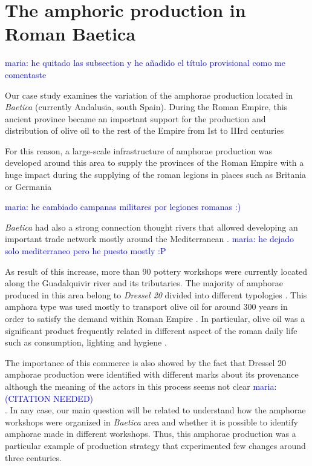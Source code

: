 \documentclass[review]{elsarticle}
\newcommand{\memo}[2]{\textcolor{#1}{#2}}
\newcommand{\maria}[1]{\memo{blue}{maria: #1\\}}
\begin{document}
\section{The amphoric production in Roman Baetica}

\maria{he quitado las subsection y he añadido el t\'itulo provisional como me comentaste}

Our case study examines the variation of the amphorae production located in \emph{Baetica} (currently Andalusia, south Spain). During the Roman Empire, this ancient province became an important support for the production and distribution of olive oil to the rest of the Empire from Ist to IIIrd centuries \cite{chic_comercio_2005,millet_anforas_1998, rodriguez_baetican_1998} 



For this reason, a large-scale infrastructure of amphorae production was developed around this area to supply the provinces of the Roman Empire with a huge impact during the supplying of the roman legions in places such as Britania \citep{funari_economic_2005, monfort_britannia_1998} or Germania \citep{remesal_annona_1986} 

\maria{he cambiado campanas militares por legiones romanas :)}

\emph{Baetica} had also a strong connection thought rivers that allowed developing an important trade network mostly around the Mediterranean \citep{garcia_vargas_enrique_formal_2010}. 
\maria{ he dejado solo mediterraneo pero he puesto mostly :P}

As result of this increase, more than 90 pottery workshops were currently located along the Guadalquivir river and its tributaries. The majority of amphorae produced in this area belong to \emph{Dressel 20} divided into different typologies \citep{berni_millet_epigrafianforica_2008, martin-kilcher_romischen_1994}. This amphora type was used mostly to transport olive oil for around 300 years in order to satisfy the demand within Roman Empire \citep{rodriguez_economioleicola_1977}. In particular, olive oil was a significant product frequently related in different aspect of the roman daily life such as consumption, lighting and hygiene \citep{mattingly_d.j._oil_1988}. 


The importance of this commerce is also showed by the fact that Dressel 20 amphorae production were identified with different marks about its provenance although the meaning of the actors in this process seems not clear \maria{(CITATION NEEDED)}. In any case, our main question will be related to understand how the amphorae workshops were organized in \textit{Baetica} area and whether it is possible to identify amphorae made in different workshops. 
Thus, this amphorae production was a particular example of production strategy that experimented few changes around three centuries.   
\end{document}
